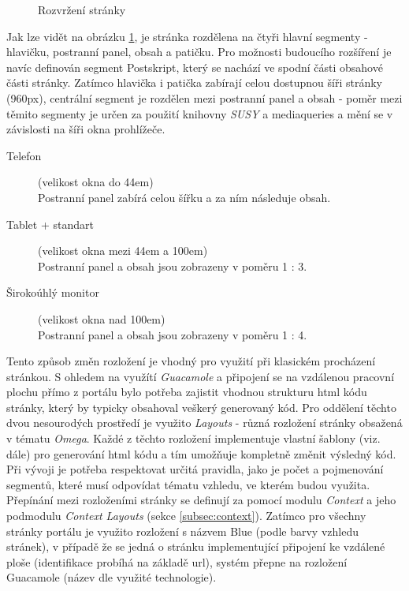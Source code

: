 \begin{figure}[htp] 
  \caption{Rozvržení stránky}
  \label{fig:rozvrzeni-stranky}
\end{figure}  

Jak lze vidět na obrázku \ref{fig:rozvrzeni-stranky}, je stránka rozdělena na čtyři hlavní segmenty - hlavičku, postranní panel, obsah a patičku. Pro možnosti budoucího rozšíření je navíc definován segment Postskript, který se nachází ve spodní části obsahové části stránky. Zatímco hlavička i patička zabírají celou dostupnou šíři stránky (960px), centrální segment je rozdělen mezi postranní panel a obsah - poměr mezi těmito segmenty je určen za použití knihovny \emph{SUSY} a \gls{mediaqueries} a mění se v závislosti na šíři okna prohlížeče\cite{responsible-drupal}. 

\begin{description}
  \item[Telefon] (velikost okna do 44em) \hfill \\
  Postranní panel zabírá celou šířku a za ním následuje obsah.
  \item[Tablet + standart] (velikost okna mezi 44em a 100em) \hfill \\
  Postranní panel a obsah jsou zobrazeny v poměru 1 : 3.
  \item[Širokoúhlý monitor] (velikost okna nad 100em) \hfill \\
  Postranní panel a obsah jsou zobrazeny v poměru 1 : 4.  
\end{description}

Tento způsob změn rozložení je vhodný pro využití při klasickém procházení stránkou. S ohledem na využítí \emph{Guacamole} a připojení se na vzdálenou pracovní plochu přímo z portálu bylo potřeba zajistit vhodnou strukturu html kódu stránky, který by typicky obsahoval veškerý generovaný kód. Pro oddělení těchto dvou nesourodých prostředí je využito \emph{Layouts} - různá rozložení stránky obsažená v tématu \emph{Omega}. Každé z těchto rozložení implementuje vlastní šablony (viz. dále) pro generování html kódu a tím umožňuje kompletně změnit výsledný kód. Při vývoji je potřeba respektovat určitá pravidla, jako je počet a pojmenování segmentů, které musí odpovídat tématu vzhledu, ve kterém budou využita. Přepínání mezi rozloženími stránky se definují za pomocí modulu \emph{Context} a jeho podmodulu \emph{Context Layouts} (sekce \ref{subsec:context}). Zatímco pro všechny stránky portálu je využito rozložení s názvem Blue (podle barvy vzhledu stránek), v případě že se jedná o stránku implementující připojení ke vzdálené ploše (identifikace probíhá na základě \gls{url}), systém přepne na rozložení Guacamole (název dle využité technologie).

